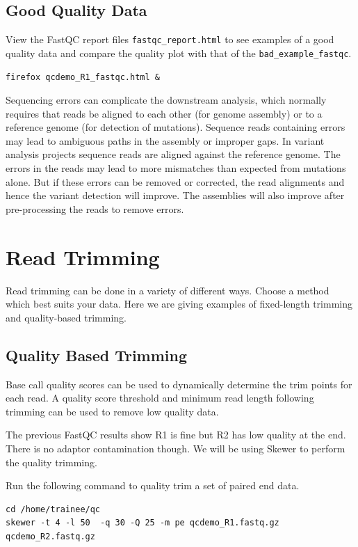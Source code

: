 \begin{bonus}
\subsection{Good Quality Data}
View the FastQC report files \texttt{fastqc\_report.html} to see examples of a good
quality data and compare the quality plot with that of the \texttt{bad\_example\_fastqc}.

\begin{lstlisting}
firefox qcdemo_R1_fastqc.html &
\end{lstlisting}
\end{bonus}

\begin{note}
Sequencing errors can complicate the downstream analysis, which normally
requires that reads be aligned to each other (for genome assembly) or to a
reference genome (for detection of mutations). Sequence reads containing errors
may lead to ambiguous paths in the assembly or improper gaps. In variant
analysis projects sequence reads are aligned against the reference genome. The
errors in the reads may lead to more mismatches than expected from
mutations alone. But if these errors can be removed or corrected, the read
alignments and hence the variant detection will improve. The assemblies will also
improve after pre-processing the reads to remove errors.
\end{note}

\section{Read Trimming}
Read trimming can be done in a variety of different ways. Choose a method
which best suits your data. Here we are giving examples of fixed-length trimming
and quality-based trimming.

\subsection{Quality Based Trimming}
Base call quality scores can be used to dynamically determine the trim
points for each read. A quality score threshold and minimum read length
following trimming can be used to remove low quality data.


\begin{steps}

The previous FastQC results show R1 is fine but R2 has low quality at the end. There is no adaptor contamination though.
We will be using Skewer to perform the quality trimming.

Run the following command to quality trim a set of paired end data.
\begin{lstlisting}
cd /home/trainee/qc
skewer -t 4 -l 50  -q 30 -Q 25 -m pe qcdemo_R1.fastq.gz qcdemo_R2.fastq.gz
\end{lstlisting}
\end{steps}


